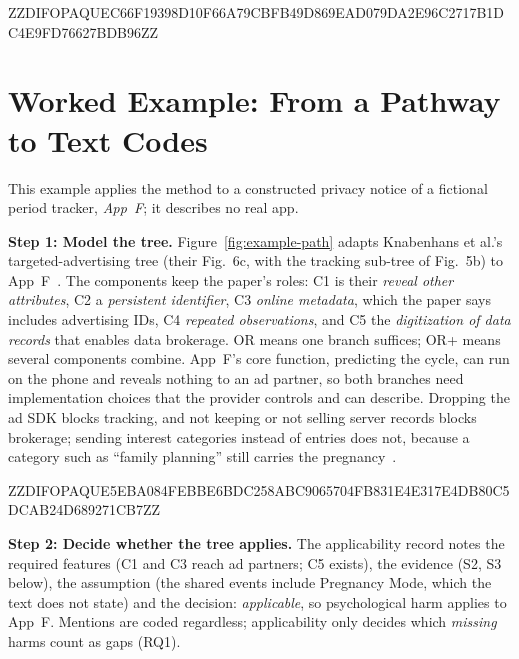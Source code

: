 \documentclass[twoside,its]{bossthesis}
\begin{document}
\begin{singlespace}
\small
\setlength{\tabcolsep}{4pt}


ZZDIFOPAQUEC66F19398D10F66A79CBFB49D869EAD079DA2E96C2717B1DC4E9FD76627BDB96ZZ


\end{singlespace}



\chapter{Worked Example: From a Pathway to Text Codes}
\label{app:example}

This example applies the method to a constructed privacy notice of a
fictional period tracker, \emph{App~F}; it describes no real app.

\textbf{Step 1: Model the tree.} Figure~\ref{fig:example-path} adapts
Knabenhans et al.'s targeted-advertising tree (their Fig.~6c, with the
tracking sub-tree of Fig.~5b) to App~F~\parencite[\S4.2]{knabenhans2026harms}.
The components keep the paper's roles: C1 is their \emph{reveal other
attributes}, C2 a \emph{persistent identifier}, C3 \emph{online metadata},
which the paper says includes advertising IDs, C4 \emph{repeated
observations}, and C5 the \emph{digitization of data records} that enables
data brokerage. OR means one branch suffices; OR+ means several components
combine. App~F's core function, predicting the cycle, can run on the phone and
reveals nothing to an ad partner, so both branches need implementation
choices that the provider controls and can describe. Dropping the ad SDK
blocks tracking, and not keeping or not selling server records blocks
brokerage; sending interest categories instead of entries does not, because a
category such as \enquote{family planning} still carries the
pregnancy~\parencite{martin2025cookies}.



ZZDIFOPAQUE5EBA084FEBBE6BDC258ABC9065704FB831E4E317E4DB80C5DCAB24D689271CB7ZZ



\textbf{Step 2: Decide whether the tree applies.} The applicability record
notes the required features (C1 and C3 reach ad partners; C5 exists), the
evidence (S2, S3 below), the assumption (the shared events include Pregnancy
Mode, which the text does not state) and the decision: \emph{applicable}, so
psychological harm applies to App~F. Mentions are coded regardless;
applicability only decides which \emph{missing} harms count as gaps (RQ1).
\end{document}
